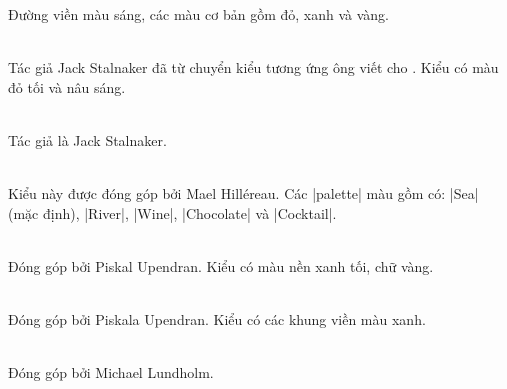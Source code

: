 \begin{description}
Đường viền màu sáng, các màu cơ bản gồm đỏ, xanh và vàng.
\\
\item{}\\
Tác giả Jack Stalnaker đã từ chuyển kiểu tương ứng ông viết cho .
Kiểu có màu đỏ tối và nâu sáng.
\\
\item{}\\
Tác giả là Jack Stalnaker.%
\\
\item{}\\
Kiểu này được đóng góp bởi Mael Hill\'ereau. Các |palette| màu
gồm có: |Sea| (mặc định), |River|, |Wine|, |Chocolate| và |Cocktail|.
\\
\item{}\\
Đóng góp bởi Piskal Upendran. Kiểu có  màu nền xanh tối, chữ vàng.
\\
\item{}\\
Đóng góp bởi Piskala Upendran. Kiểu có các khung viền màu xanh.
\\
\item{}\\
Đóng góp bởi Michael Lundholm.
\\
\item{}\\

\end{description}
